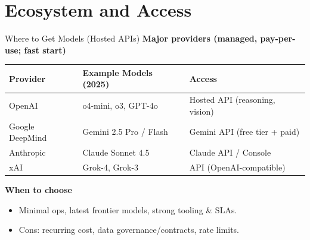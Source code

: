 \documentclass[aspectratio=169]{beamer}
\begin{document}
\section{Ecosystem and Access}

\begin{frame}{Where to Get Models (Hosted APIs)}
  \vspace{-0.3em}
  \textbf{Major providers (managed, pay-per-use; fast start)}
  \begin{center}
    \begin{tabular}{@{}lll@{}}
      \toprule
      Provider & Example Models (2025) & Access \\
      \midrule
      OpenAI & o4-mini, o3, GPT-4o & Hosted API (reasoning, vision) \\
      Google DeepMind & Gemini 2.5 Pro / Flash & Gemini API (free tier + paid) \\
      Anthropic & Claude Sonnet 4.5 & Claude API / Console \\
      xAI & Grok-4, Grok-3 & API (OpenAI-compatible) \\
      \bottomrule
    \end{tabular}
  \end{center}

  \vspace{0.6em}
  \textbf{When to choose}
  \begin{itemize}
    \item Minimal ops, latest frontier models, strong tooling \& SLAs.
    \item Cons: recurring cost, data governance/contracts, rate limits.
  \end{itemize}
\end{frame}
\end{document}
